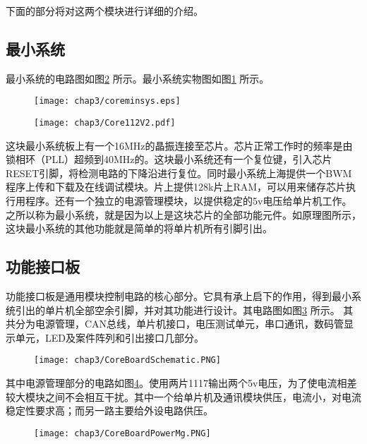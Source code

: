 下面的部分将对这两个模块进行详细的介绍。

\subsection{最小系统}
最小系统的电路图如图\ref{fig.CoreSch} 所示。最小系统实物图如图\ref{fig.CorePhoto} 所示。 \\
\begin{figure}[!htp]\label{fig.CorePhoto}
  \centering
  \texttt{[image: chap3/coreminsys.eps]}
\end{figure}
\begin{figure}[!htp]\label{fig.CoreSch}
  \centering
  \texttt{[image: chap3/Core112V2.pdf]}
\end{figure}

这块最小系统板上有一个16MHz的晶振连接至芯片。芯片正常工作时的频率是由锁相环（PLL）超频到40MHz的。这块最小系统还有一个复位键，引入芯片RESET引脚，将检测电路的下降沿进行复位。同时最小系统上海提供一个BWM程序上传和下载及在线调试模块。片上提供128k片上RAM，可以用来储存芯片执行用程序。还有一个独立的电源管理模块，以提供稳定的5v电压给单片机工作。之所以称为最小系统，就是因为以上是这块芯片的全部功能元件。如原理图所示，这块最小系统的其他功能就是简单的将单片机所有引脚引出。 

\subsection{功能接口板}
功能接口板是通用模块控制电路的核心部分。它具有承上启下的作用，得到最小系统引出的单片机全部空余引脚，并对其功能进行设计。其电路图如图\ref{fig.BaseSch} 所示。 其共分为电源管理，CAN总线，单片机接口，电压测试单元，串口通讯，数码管显示单元，LED及案件阵列和引出接口几部分。 
\begin{figure}[!htp]\label{fig.BaseSch}
  \centering
  \texttt{[image: chap3/CoreBoardSchematic.PNG]}
\end{figure}


其中电源管理部分的电路如图\ref{fig.BaseScrMg}。使用两片1117输出两个5v电压，为了使电流相差较大模块之间不会相互干扰。其中一个给单片机及通讯模块供压，电流小，对电流稳定性要求高；而另一路主要给外设电路供压。 
\begin{figure}[!htp]\label{fig.BaseScrMg}
  \centering
  \texttt{[image: chap3/CoreBoardPowerMg.PNG]}
\end{figure}


